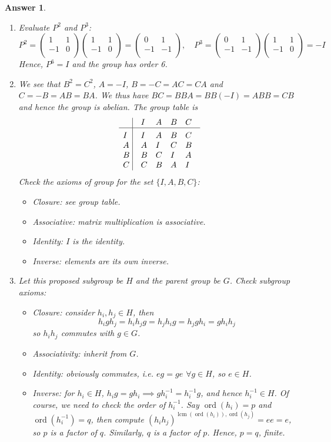 \documentclass[a4paper]{article}
\DeclareMathOperator{\ord}{ord}
\DeclareMathOperator{\lcm}{lcm}
\newtheorem{ans}{Answer}[section]
\theoremstyle{new}
\begin{document}
\begin{ans}\leavevmode
\begin{enumerate}[label=(\alph*)]
\item Evaluate $P^2$ and $P^3$:
$$P^2=\begin{pmatrix}1&1\\-1&0\\\end{pmatrix}\begin{pmatrix}1&1\\-1&0\\\end{pmatrix}=\begin{pmatrix}0&1\\-1&-1\\\end{pmatrix},\quad P^3=\begin{pmatrix}0&1\\-1&-1\\\end{pmatrix}\begin{pmatrix}1&1\\-1&0\\\end{pmatrix}=-I$$
Hence, $P^6=I$ and the group has order 6.
\item We see that $B^2=C^2$, $A=-I$, $B=-C=AC=CA$ and $C=-B=AB=BA$. We thus have $BC=BBA=BB(-I)=ABB=CB$ and hence the group is abelian. The group table is
$$\vbox{\tabskip0.5em\offinterlineskip
    \halign{\strut$#$\hfil\ \tabskip1em\vrule&&$#$\hfil\cr
    ~&I&A&B&C   \cr
    \noalign{\hrule}\vrule height 12pt width 0pt
     I&I&A&B&C    \cr
     A&A&I&C&B    \cr
     B & B &C  & I & A  \cr
     C & C & B & A & I\cr
}}$$
Check the axioms of group for the set $\{I,A,B,C\}$:
\begin{itemize}
    \item Closure: see group table.
    \item Associative: matrix multiplication is associative.
    \item Identity: $I$ is the identity.
    \item Inverse: elements are its own inverse.
\end{itemize}
\item Let this proposed subgroup be $H$ and the parent group be $G$. Check subgroup axioms:
\begin{itemize}
    \item Closure: consider $h_i,h_j\in H$, then
    $$h_igh_j=h_ih_jg=h_jh_ig=h_jgh_i=gh_ih_j$$
    so $h_ih_j$ commutes with $g\in G$.
    \item Associativity: inherit from $G$.
    \item Identity: obviously commutes, i.e. $eg=ge$ $\forall g\in H$, so $e\in H$.
    \item Inverse: for $h_i\in H$, $h_ig=gh_i\implies gh_i^{-1}=h_i^{-1}g$, and hence $h_i^{-1}\in H$. Of course, we need to check the order of $h_i^{-1}$. Say $\ord(h_i)=p$ and $\ord(h_i^{-1})=q$, then compute $(h_ih_j)^{\lcm(\ord(h_i)),\ord(h_j)}=ee=e$, so $p$ is a factor of $q$. Similarly, $q$ is a factor of $p$. Hence, $p=q$, finite.
\end{itemize}



\end{enumerate}
\end{ans}
\end{document}
